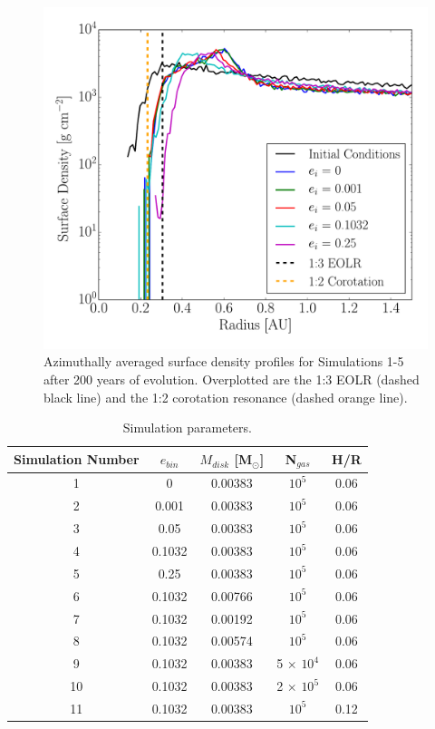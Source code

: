 \begin{figure}
	\includegraphics[width=\columnwidth]{f1}
    \caption{Azimuthally averaged surface density profiles for Simulations 1-5 after 200 years of evolution.  Overplotted are the 1:3 EOLR (dashed black line) and the 1:2 corotation resonance (dashed orange line).}
    \label{fig:figure1}
\end{figure}

\begin{table}
	\centering
	\caption{Simulation parameters.}
	\begin{tabular}{ccccc} %
		\hline
		Simulation Number & $e_{bin}$ & $M_{disk}$ [M$_{\odot}$] & N$_{gas}$ & H/R \\
		\hline
		1 & 0 & 0.00383 & $10^5$ & 0.06 \\
		2 & 0.001 & 0.00383 & $10^5$ & 0.06 \\
		3 & 0.05 & 0.00383 & $10^5$ & 0.06 \\
		4 & 0.1032 & 0.00383 & $10^5$ & 0.06 \\
		5 & 0.25 & 0.00383 & $10^5$ & 0.06 \\ 
		6 & 0.1032 & 0.00766 & $10^5$ & 0.06 \\
		7 & 0.1032 & 0.00192 & $10^5$ & 0.06 \\
		8 & 0.1032 & 0.00574 & $10^5$ & 0.06 \\
		9 & 0.1032 & 0.00383 & 5 $\times$ $10^4$ & 0.06 \\
		10 & 0.1032 & 0.00383 & 2 $\times$ $10^5$ & 0.06 \\
		11 & 0.1032 & 0.00383 & $10^5$ & 0.12 \\
		\hline
	\end{tabular}
	\label{tab:table_2}
\end{table}

